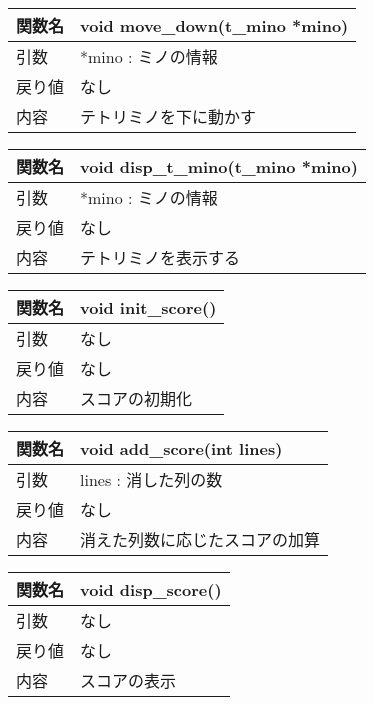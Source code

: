 \begin{table}[htb]
\begin{tabular}{|l|l|}
\hline
関数名 & void move\_down(t\_mino *mino) \\ \hline
引数  & *mino : ミノの情報                  \\ \hline
戻り値 & なし                             \\ \hline
内容  & テトリミノを下に動かす                    \\ \hline
\end{tabular}
\end{table}

\begin{table}[htb]
\begin{tabular}{|l|l|}
\hline
関数名 & void disp\_t\_mino(t\_mino *mino) \\ \hline
引数  & *mino : ミノの情報                     \\ \hline
戻り値 & なし                                \\ \hline
内容  & テトリミノを表示する                        \\ \hline
\end{tabular}
\end{table}

\begin{table}[htb]
\begin{tabular}{|l|l|}
\hline
関数名 & void init\_score() \\ \hline
引数  & なし                 \\ \hline
戻り値 & なし                 \\ \hline
内容  & スコアの初期化            \\ \hline
\end{tabular}
\end{table}

\begin{table}[htb]
\begin{tabular}{|l|l|}
\hline
関数名 & void add\_score(int lines) \\ \hline
引数  & lines : 消した列の数             \\ \hline
戻り値 & なし                         \\ \hline
内容  & 消えた列数に応じたスコアの加算            \\ \hline
\end{tabular}
\end{table}

\begin{table}[htb]
\begin{tabular}{|l|l|}
\hline
関数名 & void disp\_score() \\ \hline
引数  & なし                 \\ \hline
戻り値 & なし                 \\ \hline
内容  & スコアの表示             \\ \hline
\end{tabular}
\end{table}
